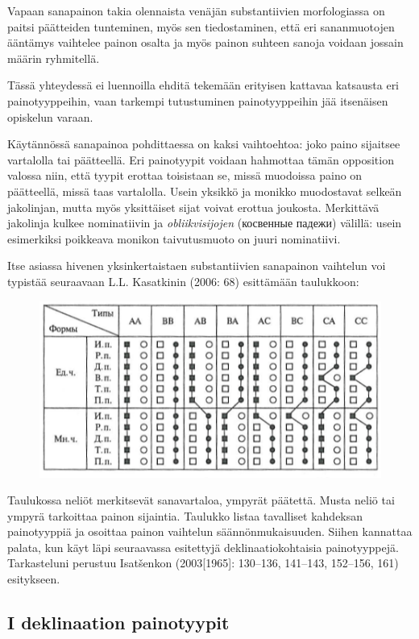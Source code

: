 \documentclass[]{scrreprt}
\begin{document}
Vapaan sanapainon takia olennaista venäjän substantiivien morfologiassa
on paitsi päätteiden tunteminen, myös sen tiedostaminen, että eri
sananmuotojen ääntämys vaihtelee painon osalta ja myös painon suhteen
sanoja voidaan jossain määrin ryhmitellä.

Tässä yhteydessä ei luennoilla ehditä tekemään erityisen kattavaa
katsausta eri painotyyppeihin, vaan tarkempi tutustuminen
painotyyppeihin jää itsenäisen opiskelun varaan.

Käytännössä sanapainoa pohdittaessa on kaksi vaihtoehtoa: joko paino
sijaitsee vartalolla tai päätteellä. Eri painotyypit voidaan hahmottaa
tämän opposition valossa niin, että tyypit erottaa toisistaan se, missä
muodoissa paino on päätteellä, missä taas vartalolla. Usein yksikkö ja
monikko muodostavat selkeän jakolinjan, mutta myös yksittäiset sijat
voivat erottua joukosta. Merkittävä jakolinja kulkee nominatiivin ja
\emph{obliikvisijojen} (косвенные падежи) välillä: usein esimerkiksi
poikkeava monikon taivutusmuoto on juuri nominatiivi.

Itse asiassa hivenen yksinkertaistaen substantiivien sanapainon
vaihtelun voi typistää seuraavaan L.L. Kasatkinin (2006: 68) esittämään
taulukkoon:

\begin{figure}[htbp]
\centering
\includegraphics{kasatkin.png}
\caption{}
\end{figure}

Taulukossa neliöt merkitsevät sanavartaloa, ympyrät päätettä. Musta
neliö tai ympyrä tarkoittaa painon sijaintia. Taulukko listaa tavalliset
kahdeksan painotyyppiä ja osoittaa painon vaihtelun säännönmukaisuuden.
Siihen kannattaa palata, kun käyt läpi seuraavassa esitettyjä
deklinaatiokohtaisia painotyyppejä. Tarkasteluni perustuu Isatšenkon
(2003{[}1965{]}: 130--136, 141--143, 152--156, 161) esitykseen.

\subsection{I deklinaation
painotyypit}\label{i-deklinaation-painotyypit}
\end{document}
